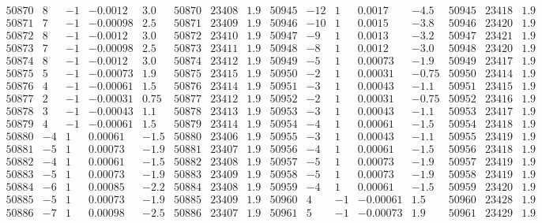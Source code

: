 \documentclass[11pt,reqno,a4letter]{article}
\numberwithin{figure}{section}
\numberwithin{table}{section}
\theoremstyle{plain}
\numberwithin{theorem}{section}
\theoremstyle{definition}
\begin{document}
\begin{table}[ht]
\begin{equation*}
{\begin{array}{ccccc|ccc||ccccc|ccc}
50870 & 8 & -1 & -0.0012 & 3.0 & 50870 & 23408 & 1.9 & 50945 & -12 & 1 & 0.0017 & -4.5 & 50945 & 23418 & 1.9  \\
50871 & 7 & -1 & -0.00098 & 2.5 & 50871 & 23409 & 1.9 & 50946 & -10 & 1 & 0.0015 & -3.8 & 50946 & 23420 & 1.9  \\
50872 & 8 & -1 & -0.0012 & 3.0 & 50872 & 23410 & 1.9 & 50947 & -9 & 1 & 0.0013 & -3.2 & 50947 & 23421 & 1.9  \\
50873 & 7 & -1 & -0.00098 & 2.5 & 50873 & 23411 & 1.9 & 50948 & -8 & 1 & 0.0012 & -3.0 & 50948 & 23420 & 1.9  \\
50874 & 8 & -1 & -0.0012 & 3.0 & 50874 & 23412 & 1.9 & 50949 & -5 & 1 & 0.00073 & -1.9 & 50949 & 23417 & 1.9  \\
50875 & 5 & -1 & -0.00073 & 1.9 & 50875 & 23415 & 1.9 & 50950 & -2 & 1 & 0.00031 & -0.75 & 50950 & 23414 & 1.9  \\
50876 & 4 & -1 & -0.00061 & 1.5 & 50876 & 23414 & 1.9 & 50951 & -3 & 1 & 0.00043 & -1.1 & 50951 & 23415 & 1.9  \\
50877 & 2 & -1 & -0.00031 & 0.75 & 50877 & 23412 & 1.9 & 50952 & -2 & 1 & 0.00031 & -0.75 & 50952 & 23416 & 1.9  \\
50878 & 3 & -1 & -0.00043 & 1.1 & 50878 & 23413 & 1.9 & 50953 & -3 & 1 & 0.00043 & -1.1 & 50953 & 23417 & 1.9  \\
50879 & 4 & -1 & -0.00061 & 1.5 & 50879 & 23414 & 1.9 & 50954 & -4 & 1 & 0.00061 & -1.5 & 50954 & 23418 & 1.9  \\
50880 & -4 & 1 & 0.00061 & -1.5 & 50880 & 23406 & 1.9 & 50955 & -3 & 1 & 0.00043 & -1.1 & 50955 & 23419 & 1.9  \\
50881 & -5 & 1 & 0.00073 & -1.9 & 50881 & 23407 & 1.9 & 50956 & -4 & 1 & 0.00061 & -1.5 & 50956 & 23418 & 1.9  \\
50882 & -4 & 1 & 0.00061 & -1.5 & 50882 & 23408 & 1.9 & 50957 & -5 & 1 & 0.00073 & -1.9 & 50957 & 23419 & 1.9  \\
50883 & -5 & 1 & 0.00073 & -1.9 & 50883 & 23409 & 1.9 & 50958 & -5 & 1 & 0.00073 & -1.9 & 50958 & 23419 & 1.9  \\
50884 & -6 & 1 & 0.00085 & -2.2 & 50884 & 23408 & 1.9 & 50959 & -4 & 1 & 0.00061 & -1.5 & 50959 & 23420 & 1.9  \\
50885 & -5 & 1 & 0.00073 & -1.9 & 50885 & 23409 & 1.9 & 50960 & 4 & -1 & -0.00061 & 1.5 & 50960 & 23428 & 1.9  \\
50886 & -7 & 1 & 0.00098 & -2.5 & 50886 & 23407 & 1.9 & 50961 & 5 & -1 & -0.00073 & 1.9 & 50961 & 23429 & 1.9  \\

\end{array}}
\end{equation*}
\end{table}
\end{document}
